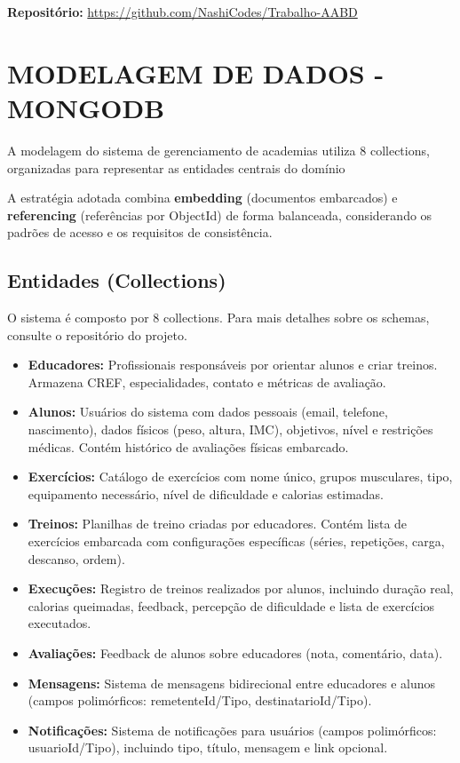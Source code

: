 \documentclass[12pt,a4paper]{article}
\begin{document}
\textbf{Repositório:} \url{https://github.com/NashiCodes/Trabalho-AABD}

\section{MODELAGEM DE DADOS - MONGODB}

A modelagem do sistema de gerenciamento de academias utiliza 8 collections, organizadas para representar as entidades centrais do domínio

A estratégia adotada combina \textbf{embedding} (documentos embarcados) e \textbf{referencing} (referências por ObjectId) de forma balanceada, considerando os padrões de acesso e os requisitos de consistência.

\subsection{Entidades (Collections)}

O sistema é composto por 8 collections. Para mais detalhes sobre os schemas, consulte o repositório do projeto.

\begin{itemize}
    \item \textbf{Educadores:} Profissionais responsáveis por orientar alunos e criar treinos. Armazena CREF, especialidades, contato e métricas de avaliação.
    
    \item \textbf{Alunos:} Usuários do sistema com dados pessoais (email, telefone, nascimento), dados físicos (peso, altura, IMC), objetivos, nível e restrições médicas. Contém histórico de avaliações físicas embarcado.
    
    \item \textbf{Exercícios:} Catálogo de exercícios com nome único, grupos musculares, tipo, equipamento necessário, nível de dificuldade e calorias estimadas.
    
    \item \textbf{Treinos:} Planilhas de treino criadas por educadores. Contém lista de exercícios embarcada com configurações específicas (séries, repetições, carga, descanso, ordem).

    \item \textbf{Execuções:} Registro de treinos realizados por alunos, incluindo duração real, calorias queimadas, feedback, percepção de dificuldade e lista de exercícios executados.
    
    \item \textbf{Avaliações:} Feedback de alunos sobre educadores (nota, comentário, data).

    \item \textbf{Mensagens:} Sistema de mensagens bidirecional entre educadores e alunos (campos polimórficos: remetenteId/Tipo, destinatarioId/Tipo).
    
    \item \textbf{Notificações:} Sistema de notificações para usuários (campos polimórficos: usuarioId/Tipo), incluindo tipo, título, mensagem e link opcional.
\end{itemize}
\end{document}

